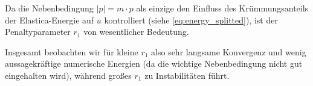 \documentclass{mythesis}
\begin{document}
Da die Nebenbedingung $|p| = m \cdot p$ als einzige den Einfluss des Krümmungsanteils der Elastica-Energie auf $u$ kontrolliert (siehe \eqref{eq:energy_splitted}), ist der Penaltyparameter $r_1$ von wesentlicher Bedeutung.

Insgesamt beobachten wir für kleine $r_1$ also sehr langsame Konvergenz und wenig aussagekräftige numerische Energien (da die wichtige Nebenbedingung nicht gut eingehalten wird), während großes $r_1$ zu Instabilitäten führt.





%
%
%
%
%
%
\end{document}
